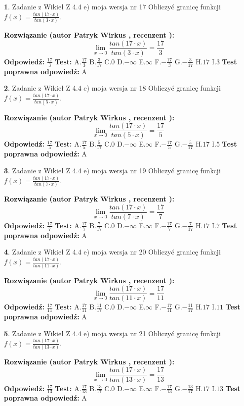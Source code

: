 \documentclass[12pt, a4paper]{article}
\theoremstyle{definition} %
\newtheorem{zad}{}
\newcommand{\zadStart}[1]{\begin{zad}#1\newline}
\newcommand{\zadStop}{\end{zad}}
\newcommand{\rozwStart}[2]{\noindent \textbf{Rozwiązanie (autor #1 , recenzent #2): }\newline}
\newcommand{\rozwStop}{\newline}
\newcommand{\odpStart}{\noindent \textbf{Odpowiedź:}\newline}
\newcommand{\odpStop}{\newline}
\newcommand{\testStart}{\noindent \textbf{Test:}\newline}
\newcommand{\testStop}{\newline}
\newcommand{\kluczStart}{\noindent \textbf{Test poprawna odpowiedź:}\newline}
\newcommand{\kluczStop}{\newline}
\begin{document}
\zadStart{Zadanie z Wikieł Z 4.4 e) moja wersja nr 17}
Obliczyć granicę funkcji $f(x)=\frac{tan(17\cdot x)}{tan(3\cdot x)}$.
\zadStop
\rozwStart{Patryk Wirkus}{}
$$\lim\limits_{x\to 0}\frac{tan(17\cdot x)}{tan(3\cdot x)}=
\frac{17}{3}$$
\rozwStop
\odpStart
$\frac{17}{3}$
\odpStop
\testStart
A.$\frac{17}{3}$
B.$\frac{3}{17}$
C.$0$
D.$-\infty$
E.$\infty$
F.$-\frac{17}{3}$
G.$-\frac{3}{17}$
H.$17$
I.$3$
\testStop
\kluczStart
A
\kluczStop



\zadStart{Zadanie z Wikieł Z 4.4 e) moja wersja nr 18}
Obliczyć granicę funkcji $f(x)=\frac{tan(17\cdot x)}{tan(5\cdot x)}$.
\zadStop
\rozwStart{Patryk Wirkus}{}
$$\lim\limits_{x\to 0}\frac{tan(17\cdot x)}{tan(5\cdot x)}=
\frac{17}{5}$$
\rozwStop
\odpStart
$\frac{17}{5}$
\odpStop
\testStart
A.$\frac{17}{5}$
B.$\frac{5}{17}$
C.$0$
D.$-\infty$
E.$\infty$
F.$-\frac{17}{5}$
G.$-\frac{5}{17}$
H.$17$
I.$5$
\testStop
\kluczStart
A
\kluczStop



\zadStart{Zadanie z Wikieł Z 4.4 e) moja wersja nr 19}
Obliczyć granicę funkcji $f(x)=\frac{tan(17\cdot x)}{tan(7\cdot x)}$.
\zadStop
\rozwStart{Patryk Wirkus}{}
$$\lim\limits_{x\to 0}\frac{tan(17\cdot x)}{tan(7\cdot x)}=
\frac{17}{7}$$
\rozwStop
\odpStart
$\frac{17}{7}$
\odpStop
\testStart
A.$\frac{17}{7}$
B.$\frac{7}{17}$
C.$0$
D.$-\infty$
E.$\infty$
F.$-\frac{17}{7}$
G.$-\frac{7}{17}$
H.$17$
I.$7$
\testStop
\kluczStart
A
\kluczStop



\zadStart{Zadanie z Wikieł Z 4.4 e) moja wersja nr 20}
Obliczyć granicę funkcji $f(x)=\frac{tan(17\cdot x)}{tan(11\cdot x)}$.
\zadStop
\rozwStart{Patryk Wirkus}{}
$$\lim\limits_{x\to 0}\frac{tan(17\cdot x)}{tan(11\cdot x)}=
\frac{17}{11}$$
\rozwStop
\odpStart
$\frac{17}{11}$
\odpStop
\testStart
A.$\frac{17}{11}$
B.$\frac{11}{17}$
C.$0$
D.$-\infty$
E.$\infty$
F.$-\frac{17}{11}$
G.$-\frac{11}{17}$
H.$17$
I.$11$
\testStop
\kluczStart
A
\kluczStop



\zadStart{Zadanie z Wikieł Z 4.4 e) moja wersja nr 21}
Obliczyć granicę funkcji $f(x)=\frac{tan(17\cdot x)}{tan(13\cdot x)}$.
\zadStop
\rozwStart{Patryk Wirkus}{}
$$\lim\limits_{x\to 0}\frac{tan(17\cdot x)}{tan(13\cdot x)}=
\frac{17}{13}$$
\rozwStop
\odpStart
$\frac{17}{13}$
\odpStop
\testStart
A.$\frac{17}{13}$
B.$\frac{13}{17}$
C.$0$
D.$-\infty$
E.$\infty$
F.$-\frac{17}{13}$
G.$-\frac{13}{17}$
H.$17$
I.$13$
\testStop
\kluczStart
A
\kluczStop
\end{document}
